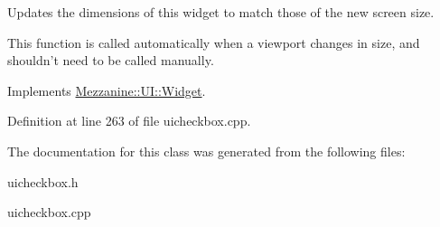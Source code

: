Updates the dimensions of this widget to match those of the new screen size. 

This function is called automatically when a viewport changes in size, and shouldn't need to be called manually. 

Implements \hyperlink{classMezzanine_1_1UI_1_1Widget_af23f919f2912ac10230953a848c9889c}{Mezzanine::UI::Widget}.



Definition at line 263 of file uicheckbox.cpp.



The documentation for this class was generated from the following files:\begin{DoxyCompactItemize}
\item 
uicheckbox.h\item 
uicheckbox.cpp\end{DoxyCompactItemize}
